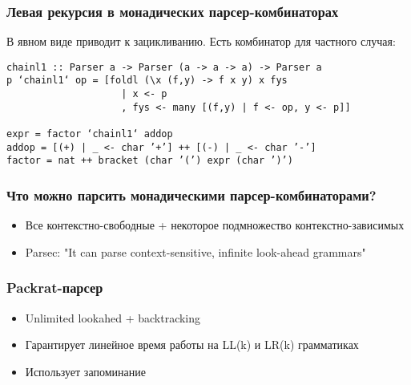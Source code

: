 \documentclass{beamer}
\begin{document}
\begin{frame}[fragile]
  \transwipe[direction=90]
  \frametitle{Левая рекурсия в монадических парсер-комбинаторах}
В явном виде приводит к зацикливанию. Есть комбинатор для частного случая:

\begin{verbatim}
chainl1 :: Parser a -> Parser (a -> a -> a) -> Parser a
p ‘chainl1‘ op = [foldl (\x (f,y) -> f x y) x fys
                    | x <- p
                    , fys <- many [(f,y) | f <- op, y <- p]]
	
expr = factor ‘chainl1‘ addop
addop = [(+) | _ <- char ’+’] ++ [(-) | _ <- char ’-’]
factor = nat ++ bracket (char ’(’) expr (char ’)’)
\end{verbatim}
\end{frame}


\begin{frame}[fragile]
  \transwipe[direction=90]
  \frametitle{Что можно парсить монадическими парсер-комбинаторами?}
  \begin{itemize}
    \item Все контекстно-свободные + некоторое подмножество контекстно-зависимых
  \end{itemize}
  \begin{itemize}
    \item Parsec: "It can parse context-sensitive, infinite look-ahead grammars"
  \end{itemize}
\end{frame}

\begin{frame}[fragile]
  \transwipe[direction=90]
  \frametitle{Packrat-парсер}
  \begin{itemize}               
    \item Unlimited lookahed + backtracking 
    \item Гарантирует линейное время работы на LL(k) и LR(k) грамматиках
    \item Использует запоминание
  \end{itemize}
\end{frame}
         
\end{document}
